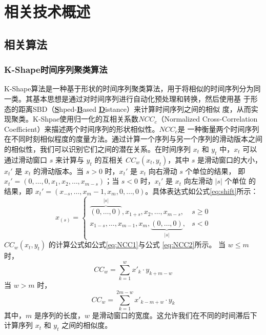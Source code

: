 \chapter{相关技术概述}
\section{相关算法}
\subsection{K-Shape时间序列聚类算法}
\label{section2.1.1}
K-Shape算法\cite{yang2017k}是一种基于形状的时间序列聚类算法，用于将相似的时间序列分为同一类。其基本思想是通过对时间序列进行自动化预处理和转换，然后使用基
于形态的距离SBD（\textbf{\underline{S}}hped-\textbf{\underline{B}}ased \textbf{\underline{D}}istance）来计算时间序列之间的相似
度，从而实现聚类。K-Shpae使用归一化的互相关系数$NCC_{c}$（Normalized Cross-Correlation Coefficient）来描述两个时间序列的形状相似性。$NCC_{c}$是
一种衡量两个时间序列在不同时刻相似程度的度量方法。通过计算一个序列与另一个序列的滑动版本之间的相似性，我们可以识别它们之间的潜在关系。在时间序列 \( x_t \) 
和 \( y_t \) 中，\( x_t \) 可以通过滑动窗口 \( s \) 来计算与 \( y_t \) 的互相关 \( CC_w(x_t, y_t) \)，其中 \( s \) 是滑动窗口的大小，
\( x_t' \) 是 \( x_t \) 的滑动版本。当 \( s > 0 \) 时，\( x_t' \) 是 \( x_t \) 向右滑动 \( s \) 个单位的结果，
即 \( x_t' = (0, \ldots, 0, x_1, x_2, \ldots, x_{m-s}) \)；当 \( s < 0 \) 时，\( x_t' \) 是 \( x_t \) 向左滑动 \( |s| \) 个单位
的结果，即 \( x_t' = (x_{-s}, \ldots, x_m - 1, x_m, 0, \ldots, 0) \)。具体表达式如公式\eqref{eq:shift}所示：
\begin{equation}
    x_(s) = 
        \begin{cases} 
        \overbrace{(0, \ldots, 0)}^{|s|}, x_{1+s}, x_2, \ldots, x_{m-s}, & s \geq 0 \\
        x_{1-s}, \ldots, x_{m-1}, x_m, \underbrace{(0, \ldots, 0)}_{|s|}, & s < 0 
        \end{cases}
    \label{eq:shift}
\end{equation}
\( CC_w(x_t, y_t) \) 的计算公式如公式\eqref{eq:NCC1}与公式
\eqref{eq:NCC2}所示。
当 \( w \leq m \) 时，
\begin{equation}
CC_w = \sum_{k=1}^w x'_k \cdot y_{k+m-w}
\label{eq:NCC1}
\end{equation}
当 \( w > m \) 时，
\begin{equation}
CC_w = \sum_{k=1}^{2m-w} x'_{k-m+w} \cdot y_k
\label{eq:NCC2}
\end{equation}
其中，\( m \) 是序列的长度，\( w \) 是滑动窗口的宽度。这允许我们在不同的时间滞后下计算序列 \( x_t \) 和 \( y_t \) 之间的相似度。

